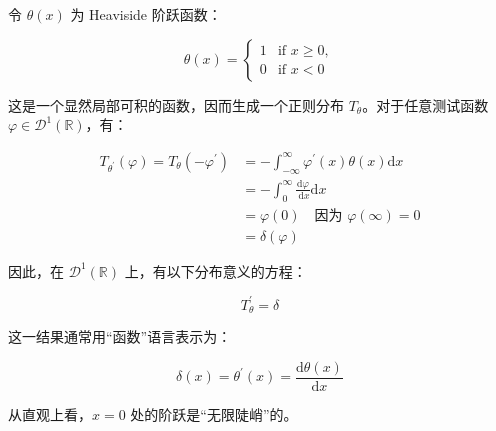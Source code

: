 \begin{eg}\label{eg:12.4} 
  令 $\theta(x)$ 为 Heaviside 阶跃函数：

$$
\theta(x) = 
\begin{cases} 
1 & \text{if } x \geq 0, \\ 
0 & \text{if } x < 0 
\end{cases}
$$

这是一个显然局部可积的函数，因而生成一个正则分布
$T_\theta$。对于任意测试函数
$\varphi \in \mathcal{D}^1(\mathbb{R})$，有：

$$
\begin{aligned}
T_{\theta^{\prime}}(\varphi) = T_\theta\left(-\varphi^{\prime}\right) & = -\int_{-\infty}^\infty \varphi^{\prime}(x) \theta(x) \mathrm{d}x \\
& = -\int_0^\infty \frac{\mathrm{d}\varphi}{\mathrm{~d}x} \mathrm{d}x \\
& = \varphi(0) \quad \text{因为 } \varphi(\infty) = 0 \\
& = \delta(\varphi)
\end{aligned}
$$

因此，在 $\mathcal{D}^1(\mathbb{R})$ 上，有以下分布意义的方程：

$$
T_\theta^{\prime} = \delta
$$

这一结果通常用``函数''语言表示为：

$$
\delta(x) = \theta^{\prime}(x) = \frac{\mathrm{d}\theta(x)}{\mathrm{d}x}
$$

从直观上看，$x=0$ 处的阶跃是``无限陡峭''的。
\end{eg}


